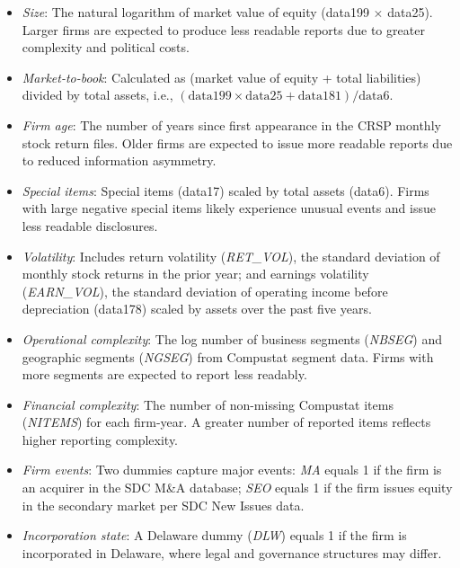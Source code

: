\documentclass[a4paper]{article}
\begin{document}
\begin{itemize} \itemsep0pt \parskip0pt 
\item \textit{Size}: The natural logarithm of market value of equity (data199 $\times$ data25). Larger firms are expected to produce less readable reports due to greater complexity and political costs.

\item \textit{Market-to-book}: Calculated as (market value of equity + total liabilities) divided by total assets, i.e., \((\text{data199} \times \text{data25} + \text{data181})/\text{data6}\). 

\item \textit{Firm age}: The number of years since first appearance in the CRSP monthly stock return files. Older firms are expected to issue more readable reports due to reduced information asymmetry.

\item \textit{Special items}: Special items (data17) scaled by total assets (data6). Firms with large negative special items likely experience unusual events and issue less readable disclosures.

\item \textit{Volatility}: Includes return volatility (\textit{RET\_VOL}), the standard deviation of monthly stock returns in the prior year; and earnings volatility (\textit{EARN\_VOL}), the standard deviation of operating income before depreciation (data178) scaled by assets over the past five years.

\item \textit{Operational complexity}: The log number of business segments (\textit{NBSEG}) and geographic segments (\textit{NGSEG}) from Compustat segment data. Firms with more segments are expected to report less readably.

\item \textit{Financial complexity}: The number of non-missing Compustat items (\textit{NITEMS}) for each firm-year. A greater number of reported items reflects higher reporting complexity.

\item \textit{Firm events}: Two dummies capture major events: \textit{MA} equals 1 if the firm is an acquirer in the SDC M\&A database; \textit{SEO} equals 1 if the firm issues equity in the secondary market per SDC New Issues data.

\item \textit{Incorporation state}: A Delaware dummy (\textit{DLW}) equals 1 if the firm is incorporated in Delaware, where legal and governance structures may differ.

\end{itemize}
\end{document}
